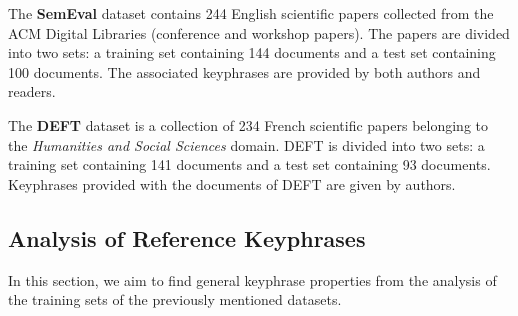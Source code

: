     The \textbf{SemEval} dataset \cite{kim2010semeval} contains 244 English
    scientific papers collected from the ACM Digital Libraries (conference and
    workshop papers). The papers are divided into two sets: a training set
    containing 144 documents and a test set containing 100 documents. The
    associated keyphrases are provided by both authors and readers.

    The \textbf{DEFT} dataset \cite{Paroubek2012deft} is a collection of 234
    French scientific papers belonging to the \textit{Humanities and Social
    Sciences} domain. DEFT is divided into two sets: a training set containing
    141 documents and a test set containing 93 documents. Keyphrases provided
    with the documents of DEFT are given by authors.

  \subsection{Analysis of Reference Keyphrases}
  \label{subsec:keyphrase_analysis}
    In this section, we aim to find general keyphrase properties from the
    analysis of the training sets of the previously mentioned datasets.

